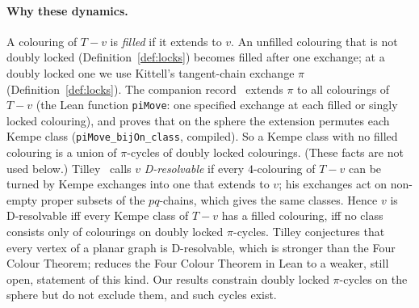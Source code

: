 \documentclass[11pt]{article}
\theoremstyle{definition}
\newcommand{\lean}[1]{\texttt{#1}}
\begin{document}
\paragraph{Why these dynamics.} A colouring of $T-v$ is \emph{filled} if it extends to $v$. An unfilled colouring that is not doubly locked (Definition~\ref{def:locks}) becomes filled after one exchange; at a doubly locked one we use Kittell's tangent-chain exchange $\pi$ (Definition~\ref{def:locks}). The companion record~\cite{vhe2026} extends $\pi$ to all colourings of $T-v$ (the Lean function \lean{piMove}: one specified exchange at each filled or singly locked colouring), and proves that on the sphere the extension permutes each Kempe class (\lean{piMove\_bijOn\_class}, compiled). So a Kempe class with no filled colouring is a union of $\pi$-cycles of doubly locked colourings. (These facts are not used below.) Tilley~\cite{tilley2017} calls $v$ \emph{D-resolvable} if every $4$-colouring of $T-v$ can be turned by Kempe exchanges into one that extends to $v$; his exchanges act on non-empty proper subsets of the $pq$-chains, which gives the same classes. Hence $v$ is D-resolvable iff every Kempe class of $T-v$ has a filled colouring, iff no class consists only of colourings on doubly locked $\pi$-cycles. Tilley conjectures that every vertex of a planar graph is D-resolvable, which is stronger than the Four Colour Theorem; \cite{vhe2026} reduces the Four Colour Theorem in Lean to a weaker, still open, statement of this kind. Our results constrain doubly locked $\pi$-cycles on the sphere but do not exclude them, and such cycles exist.
\end{document}
